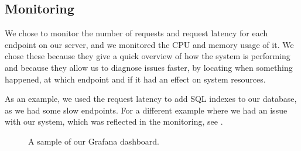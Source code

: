 \subsection{Monitoring}
\label{section:process-monitoring}
 We chose to monitor the number of requests and request latency for each endpoint on our server, and we monitored the CPU and memory usage of it. We chose these because they give a quick overview of how the system is performing and because they allow us to diagnose issues faster, by locating when something happened, at which endpoint and if it had an effect on system resources.

As an example, we used the request latency to add SQL indexes to our database, as we had some slow endpoints. For a different example where we had an issue with our system, which was reflected in the monitoring, see .

\begin{figure}[H]
    \caption{A sample of our Grafana dashboard.}
\end{figure}
